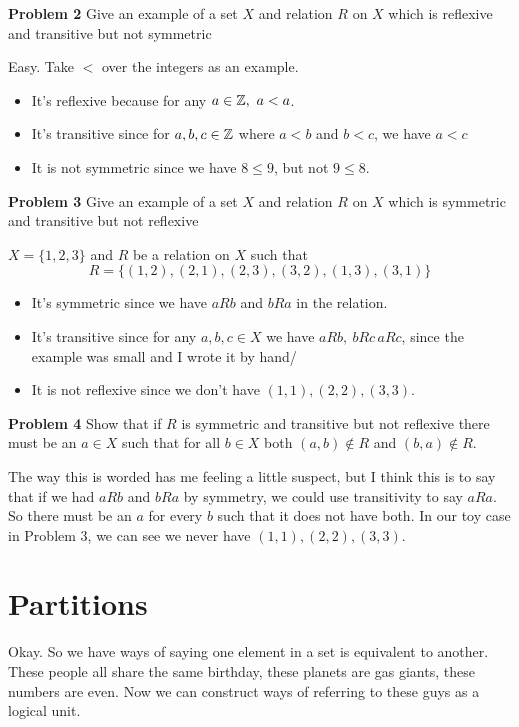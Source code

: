 \textbf{Problem 2} Give an example of a set \(X\) and relation \(R\) on \(X\) which is reflexive and transitive but not symmetric

Easy. Take \(<\) over the integers as an example.

\begin{itemize}
    \item It's reflexive because for any \(a \in \mathbb{Z},\ a < a\).
    \item It's transitive since for \(a,b,c \in \mathbb{Z}\) where \(a < b\) and \(b < c\), we have \(a < c\)
    \item It is not symmetric since we have \(8 \leq 9\), but not \(9 \leq 8\).
\end{itemize}

\textbf{Problem 3} Give an example of a set \(X\) and relation \(R\) on \(X\) which is symmetric and transitive but not reflexive

\(X = \{1,2,3\}\) and \(R\) be a relation on \(X\) such that \[R = \{(1,2), (2,1), (2,3), (3,2), (1,3), (3,1)\}\]
\begin{itemize}
    \item It's symmetric since we have \(aRb\) and \(bRa\) in the relation.
    \item It's transitive since for any \(a,b,c \in X\) we have \(aRb,\ bRc\, aRc\), since the example was small and I wrote it by hand/
    \item It is not reflexive since we don't have \((1,1), (2,2), (3,3)\).
\end{itemize}

\textbf{Problem 4} Show that if \(R\) is symmetric and transitive but not reflexive there must be an \(a \in X\) such that for all \(b \in X \) both \((a, b) \notin R\) and \((b, a) \notin R\).

The way this is worded has me feeling a little suspect, but I think this is to say that if we had \(aRb\) and \(bRa\) by symmetry, we could use transitivity to say \(aRa\). So there must be an \(a\) for every \(b\) such that it does not have both. In our toy case in Problem 3, we can see we never have \((1,1), (2,2), (3,3)\).

\section{Partitions}

Okay. So we have ways of saying one element in a set is equivalent to another. These people all share the same birthday, these planets are gas giants, these numbers are even. Now we can construct ways of referring to these guys as a logical unit.

